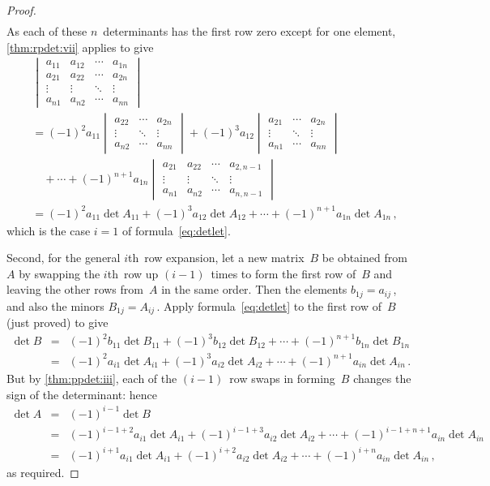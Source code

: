 \begin{proof}
\begin{align*}
\end{align*}
As each of these \(n\)~determinants has the first row zero except for one element,  \cref{thm:rpdet:vii} applies to give
\begin{align*}&
\begin{vmatrix} a_{11}&a_{12}&\cdots&a_{1n}
\\ a_{21}&a_{22}&\cdots&a_{2n}
\\ \vdots&\vdots&\ddots&\vdots
\\ a_{n1}&a_{n2}&\cdots&a_{nn}
\end{vmatrix}
\\&=
(-1)^2a_{11}\begin{vmatrix} 
 a_{22}&\cdots&a_{2n}
\\ \vdots&\ddots&\vdots
\\ a_{n2}&\cdots&a_{nn}
\end{vmatrix}
+(-1)^3a_{12}\begin{vmatrix} 
 a_{21}&\cdots&a_{2n}
\\ \vdots&\ddots&\vdots
\\ a_{n1}&\cdots&a_{nn}
\end{vmatrix}
\\&\quad{}
+\cdots
+(-1)^{n+1}a_{1n}\begin{vmatrix}  
a_{21}&a_{22}&\cdots&a_{2,n-1}
\\ \vdots&\vdots&\ddots&\vdots
\\ a_{n1}&a_{n2}&\cdots&a_{n,n-1}
\end{vmatrix}
\\&=(-1)^2a_{11}\det A_{11}
+(-1)^3a_{12}\det A_{12}
+\cdots
+(-1)^{n+1}a_{1n}\det A_{1n}\,,
\end{align*}
which is the case \(i=1\) of formula~\eqref{eq:detlet}.

Second, for the general \(i\)th~row expansion, let a new matrix~\(B\) be obtained from~\(A\) by swapping the \(i\)th~row up \((i-1)\)~times to form the first row of~\(B\) and leaving the other rows from~\(A\) in the same order.
Then the elements \(b_{1j}=a_{ij}\)\,, and also the minors \(B_{1j}=A_{ij}\)\,.
Apply formula~\eqref{eq:detlet} to the first row of~\(B\) (just proved) to give
\begin{eqnarray*}
\det B&=&(-1)^2b_{11}\det B_{11}
+(-1)^3b_{12}\det B_{12}
+\cdots
+(-1)^{n+1}b_{1n}\det B_{1n}
\\&=&(-1)^2a_{i1}\det A_{i1}
+(-1)^3a_{i2}\det A_{i2}
+\cdots
+(-1)^{n+1}a_{in}\det A_{in}\,.
\end{eqnarray*}
But by \cref{thm:ppdet:iii}, each of the \((i-1)\)~row swaps in forming~\(B\) changes the sign of the determinant: hence
\begin{eqnarray*}
\det A&=&(-1)^{i-1}\det B
\\&=&(-1)^{i-1+2}a_{i1}\det A_{i1}
+(-1)^{i-1+3}a_{i2}\det A_{i2}
+\cdots
+(-1)^{i-1+n+1}a_{in}\det A_{in}
\\&=&(-1)^{i+1}a_{i1}\det A_{i1}
+(-1)^{i+2}a_{i2}\det A_{i2}
+\cdots
+(-1)^{i+n}a_{in}\det A_{in}\,,
\end{eqnarray*}
as required.
\end{proof}



